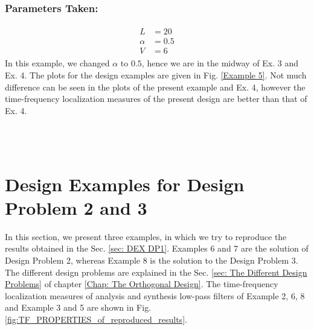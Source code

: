 \subsubsection{Parameters Taken:}
\begin{eqnarray*}
\begin{aligned}
L &= 20\\
\alpha &= 0.5\\
V &= 6
\end{aligned}
\end{eqnarray*}
In this example, we changed $\alpha$ to $0.5$, hence we are in the midway of Ex. 3 and Ex. 4. The plots for the design examples are given in Fig. \ref{Example 5}. Not much difference can be seen in the plots of the present example and Ex. 4, however the time-frequency localization measures of the present design are better than that of Ex. 4.
\begin{figure*}
\centering
{}\\
\\
%

\caption{Example 5}
\label{Example 5}
\end{figure*}

\section{Design Examples for Design Problem 2 and 3}
In this section, we present three examples, in which we try to reproduce the results obtained in the Sec. \ref{sec: DEX DP1}. Examples 6 and 7 are the solution of Design Problem 2, whereas Example 8 is the solution to the Design Problem 3. The different design problems are explained in the Sec. \ref{sec: The Different Design Problems} of chapter \ref{Chap: The Orthogonal Design}. The time-frequency localization measures of analysis and synthesis low-pass filters of Example 2, 6, 8 and Example 3 and 5 are shown in Fig. \ref{fig:TF_PROPERTIES_of_reproduced_results}. 
